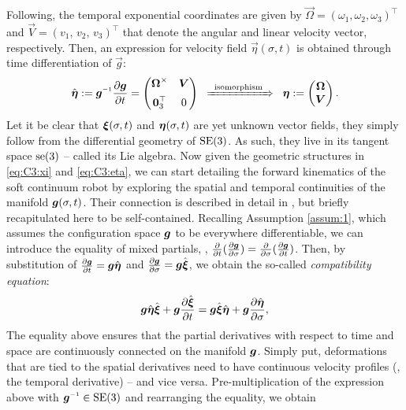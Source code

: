 Following, the temporal exponential coordinates are given by $\vec{\Omega} = (\omega_1, \omega_2, \omega_3)^\top$ and $\vec{V} = (v_1,\,v_2,\, v_3)^\top$ that denote the angular and linear velocity vector, respectively. Then, an expression for velocity field $\vec{\eta}(\sigma,t)$ is obtained through time differentiation of $\vec{g}$:
%
\begin{equation}
\hat{\vec{\eta}} := \mat{g}\inv \frac{\p \mat{g}}{\p t} = \begin{pmatrix} \vec{\Omega}^\times & \vec{V} \\[0.5em] \vec{0}_3^\top & 0 \end{pmatrix} \;\; \xRightarrow[]{\textrm{\;\;isomorphism\;\;}} \;\; \vec{\eta} := \begin{pmatrix} \vec{\Omega} \\ \vec{V} \end{pmatrix}.
\label{eq:C3:eta}
\end{equation}
%
Let it be clear that ${\boldsymbol{\xi}}(\sigma,t)$ and ${\boldsymbol{\eta}}(\sigma,t)$ are yet unknown {vector fields}, they simply follow from the differential geometry of $\textup{\textrm{SE}}(3)$. As such, they live in its tangent space $\textup{\textrm{se}}(3)$ -- called its Lie algebra. Now given the geometric structures in \eqref{eq:C3:xi} and \eqref{eq:C3:eta}, we can start detailing the forward kinematics of the soft continuum robot by exploring the spatial and temporal continuities of the manifold ${\boldsymbol{g}}(\sigma,t)$.
Their connection is described in detail in \cite{Simo1986,Boyer2010,Boyer2021,Renda2017Aug,Renda2018}, but briefly recapitulated here to be self-contained. 
Recalling Assumption \ref{assum:1}, which assumes the configuration space $\boldsymbol{g}$ to be everywhere differentiable, we can introduce the equality of mixed partials, \ie, $\frac{\partial }{\partial t}(\frac{\partial \boldsymbol{g}}{\partial \sigma}) = \frac{\partial }{\partial \sigma} (\frac{\partial \boldsymbol{g}}{\partial t})$. Then, by substitution of $\frac{\partial \boldsymbol{g}}{\partial t} = \boldsymbol{g}\hat{\boldsymbol{\eta}}$ and $\frac{\partial \boldsymbol{g}}{\partial \sigma} = \boldsymbol{g}\hat{\boldsymbol{\xi}}$, we obtain the so-called \emph{compatibility equation}:
%
\begin{equation}
\boldsymbol{g} \hat{\boldsymbol{\eta}}\hat{\boldsymbol{\xi}} + \boldsymbol{g} \frac{\partial \hat{\boldsymbol{\xi}}}{\partial t}  = \boldsymbol{g} \hat{\boldsymbol{\xi}} \hat{\boldsymbol{\eta}}  + \boldsymbol{g} \frac{\partial \hat{\boldsymbol{\eta}}}{\partial \sigma},
\label{eq:C3:compatibility}
\end{equation}
%
\noindent
The equality above ensures that the partial derivatives with respect to time and space are continuously connected on the manifold ${\boldsymbol{g}}$. Simply put, deformations that are tied to the spatial derivatives need to have continuous velocity profiles (\ie, the temporal derivative) -- and vice versa. Pre-multiplication of the expression above with $\mat{g} \inv \in \SE{3}$ and rearranging the equality, we obtain
